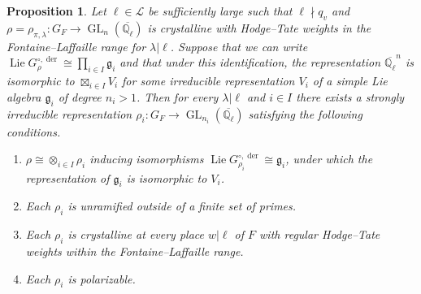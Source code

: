 \documentclass{amsart}
\newtheorem{proposition}[theorem]{Proposition}
\theoremstyle{definition}
\numberwithin{equation}{section} %
\newcommand{\GL}{\operatorname{GL}}
\newcommand{\Lie}{\operatorname{Lie}}
\newcommand{\der}{\operatorname{der}}
\newcommand{\Qlbar}{\ensuremath{\overline{\mathbb{Q}_\ell}}}
\newcommand{\mf}[1]{\mathfrak{#1}}
\begin{document}
\begin{proposition}\label{prop: tensor decomposition over CM field}
Let $\ell\in \mathcal{L}$ be sufficiently large such that $\ell \nmid q_v$ and $\rho = \rho_{\pi,\lambda}: G_F\to \GL_n(\Qlbar)$ is crystalline with Hodge--Tate weights in the Fontaine--Laffaille range for $\lambda| \ell$.
Suppose that we can write $\Lie G_{\rho}^{\circ,\der}  \cong \prod_{i \in I} \mf{g}_i$ and that under this identification, the representation $\Qlbar^{n}$ is isomorphic to $\boxtimes_{i \in I} V_i$ for some irreducible representation $V_i$ of a simple Lie algebra $\mf{g}_i$ of degree $n_i > 1$.
Then for every $\lambda | \ell$ and $i \in I$ there exists a strongly irreducible representation \( \rho_i: G_{F}\to \GL_{n_i}(\Qlbar)\) satisfying the following conditions.
\begin{enumerate}
    \item \(\rho \cong \otimes_{i \in I} \rho_i \) inducing isomorphisms $\Lie G_{\rho_i}^{\circ,\der} \cong \mf{g}_i$, under which the representation of $\mf{g}_i$ is isomorphic to $V_i$.
    \item Each $\rho_i$ is unramified outside of a finite set of primes.
    \item Each $\rho_i$ is crystalline at every place $w|\ell$ of $F$ with regular Hodge--Tate weights within the Fontaine--Laffaille range.
    \item Each $\rho_i$ is polarizable.
\end{enumerate}  
\end{proposition}
\end{document}

